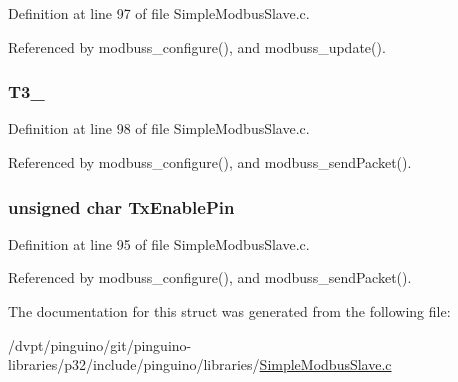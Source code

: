 Definition at line 97 of file Simple\-Modbus\-Slave.\-c.



Referenced by modbuss\-\_\-configure(), and modbuss\-\_\-update().

\hypertarget{struct_m_o_d_b_u_s_s___d_a_t_a_a447e609a8854bfac7df24c9fef39dfc7}{
\subsubsection[{T3\-\_\-5}]{ T3\-\_}}\label{struct_m_o_d_b_u_s_s___d_a_t_a_a447e609a8854bfac7df24c9fef39dfc7}


Definition at line 98 of file Simple\-Modbus\-Slave.\-c.



Referenced by modbuss\-\_\-configure(), and modbuss\-\_\-send\-Packet().

\hypertarget{struct_m_o_d_b_u_s_s___d_a_t_a_ad048cd33a540516a2e4ec649694e2f1a}{
\subsubsection[{Tx\-Enable\-Pin}]{\setlength{\rightskip}{0pt plus 5cm}unsigned char Tx\-Enable\-Pin}}\label{struct_m_o_d_b_u_s_s___d_a_t_a_ad048cd33a540516a2e4ec649694e2f1a}


Definition at line 95 of file Simple\-Modbus\-Slave.\-c.



Referenced by modbuss\-\_\-configure(), and modbuss\-\_\-send\-Packet().



The documentation for this struct was generated from the following file\-:\begin{DoxyCompactItemize}
\item 
/dvpt/pinguino/git/pinguino-\/libraries/p32/include/pinguino/libraries/\hyperlink{_simple_modbus_slave_8c}{Simple\-Modbus\-Slave.\-c}\end{DoxyCompactItemize}
